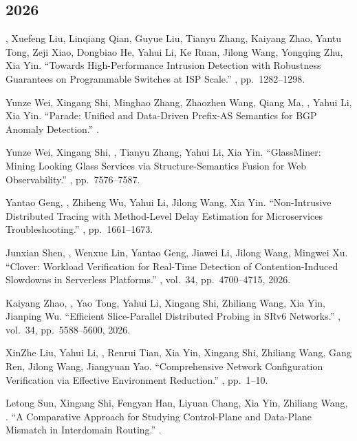 \documentclass[11pt]{article}
\begin{document}
\subsection*{2026}
\begin{publist}
\item {}, Xuefeng Liu, Linqiang Qian, Guyue Liu, Tianyu Zhang, Kaiyang
Zhao, Yantu Tong, Zeji Xiao, Dongbiao He, Yahui Li, Ke Ruan, Jilong Wang, Yongqing
Zhu, Xia Yin. ``Towards High-Performance Intrusion Detection with Robustness
Guarantees on Programmable Switches at ISP Scale.'' ,
pp.~1282--1298.
\item Yunze Wei, Xingang Shi, Minghao Zhang, Zhaozhen Wang, Qiang Ma, ,
Yahui Li, Xia Yin. ``Parade: Unified and Data-Driven Prefix-AS Semantics for BGP
Anomaly Detection.'' . 
\item Yunze Wei, Xingang Shi, \corr, Tianyu Zhang, Yahui Li, Xia Yin.
``GlassMiner: Mining Looking Glass Services via Structure-Semantics Fusion for Web
Observability.'' , pp.~7576--7587.
\item Yantao Geng, \corr, Zhiheng Wu, Yahui Li, Jilong Wang, Xia Yin.
``Non-Intrusive Distributed Tracing with Method-Level Delay Estimation for
Microservices Troubleshooting.'' , pp.~1661--1673.
\item Junxian Shen, \corr, Wenxue Lin, Yantao Geng, Jiawei Li, Jilong
Wang, Mingwei Xu. ``Clover: Workload Verification for Real-Time Detection of
Contention-Induced Slowdowns in Serverless Platforms.'' , vol.~34, pp.~4700--4715, 2026.
\item Kaiyang Zhao, \corr, Yao Tong, Yahui Li, Xingang Shi, Zhiliang
Wang, Xia Yin, Jianping Wu. ``Efficient Slice-Parallel Distributed Probing in SRv6
Networks.'' , vol.~34, pp.~5588--5600, 2026.
\item XinZhe Liu, Yahui Li, , Renrui Tian, Xia Yin, Xingang Shi,
Zhiliang Wang, Gang Ren, Jilong Wang, Jiangyuan Yao. ``Comprehensive Network
Configuration Verification via Effective Environment Reduction.''
, pp.~1--10.
\item Letong Sun, Xingang Shi, Fengyan Han, Liyuan Chang, Xia Yin, Zhiliang Wang,
. ``A Comparative Approach for Studying Control-Plane and Data-Plane
Mismatch in Interdomain Routing.'' . 

\end{publist}
\end{document}
